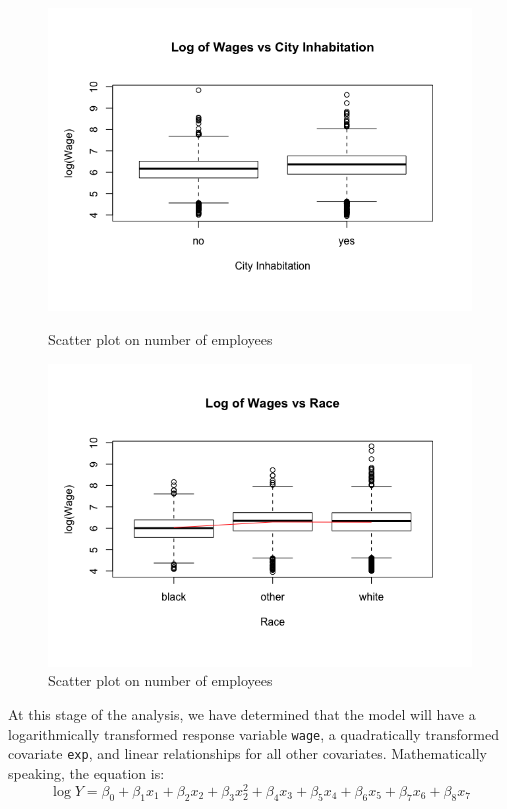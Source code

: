 \documentclass{article}
\begin{document}
\begin{figure}
\begin{minipage}{.45\textwidth}
          \includegraphics[scale=0.35]{transformation/boxcity}
          \caption{Scatter plot on number of employees}
          \label{fig:boxcity}

          \includegraphics[scale=0.35]{transformation/boxrace}
          \caption{Scatter plot on number of employees}
          \label{fig:boxrace}
        \end{minipage}
      \end{figure}

      At this stage of the analysis, we have determined that the model will have
      a logarithmically transformed response variable \texttt{wage}, a quadratically
      transformed covariate \texttt{exp}, and linear relationships for all other covariates.
      Mathematically speaking, the equation is:
      \[ \log{Y} = \beta_0 + \beta_1 x_1 + \beta_2 x_2 + \beta_3 x_2^2 + \beta_4 x_3
                     + \beta_5 x_4 + \beta_6 x_5 + \beta_7 x_6 + \beta_8 x_7\]
\end{document}
